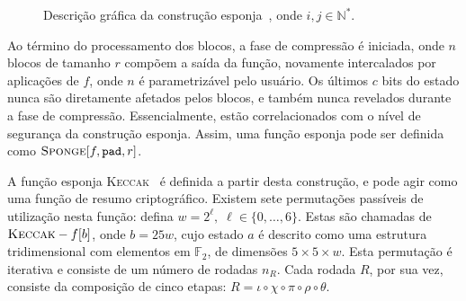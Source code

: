 \documentclass[12pt]{report}
\begin{document}
\begin{figure}[ht]
    
    \caption{Descrição gráfica da construção
        esponja~\cite{TikZ:for:Cryptographers}, onde $i, j \in \mathbb{N}^{*}$.}
    \label{fig:3}
\end{figure}


Ao término do processamento dos blocos, a fase de compressão é iniciada, onde
$n$ blocos de tamanho $r$ compõem a saída da função, novamente intercalados por
aplicações de $f$, onde $n$ é parametrizável pelo usuário. Os últimos $c$ bits
do estado nunca são diretamente afetados pelos blocos, e também nunca revelados
durante a fase de compressão. Essencialmente, estão correlacionados com o nível
de segurança da construção esponja. Assim, uma função esponja pode ser definida
como $\textsc{Sponge}[f, \texttt{pad}, r]$.

A função esponja \textsc{Keccak}~\cite{KeccakReference} é definida a partir
desta construção, e pode agir como uma função de resumo criptográfico. Existem
sete permutações passíveis de utilização nesta função: defina $w = 2^{\ell}, \;
\ell \in \{0, \dots, 6\}$.  Estas são chamadas de $\textsc{Keccak}-f[b]$, onde
$b = 25w$, cujo estado $a$ é descrito como uma estrutura tridimensional com
elementos em $\mathbb{F}_2$, de dimensões $5 \times 5 \times w$. Esta
permutação é iterativa e consiste de um número de rodadas $n_R$. Cada rodada
$R$, por sua vez, consiste da composição de cinco etapas: $R = \iota \circ \chi
\circ \pi \circ \rho \circ \theta$.
\end{document}
